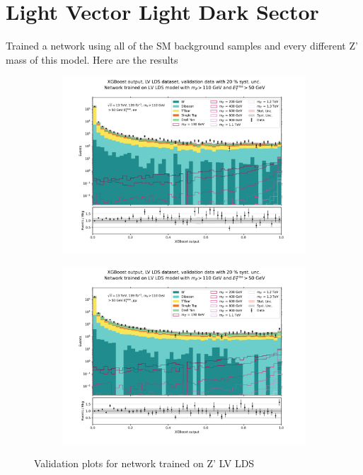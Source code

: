 \documentclass[14pt, a4paper]{book}
\begin{document}
\newpage
\section{Light Vector Light Dark Sector}Trained a network using all of the SM background samples and every different Z' mass of this model. Here are the results
\begin{figure}[!ht]
	\centering
	\begin{subfigure}[b]{0.49\textwidth}
      \centering
      \includegraphics[width=1\textwidth]{XGBoost/LV_LDS/VAL_ee.pdf}
      \end{subfigure}
   \hfill
   \begin{subfigure}[b]{0.49\textwidth}
      \centering
      \includegraphics[width=1\textwidth]{XGBoost/LV_LDS/VAL_uu.pdf}
      \end{subfigure}
   \caption{Validation plots for network trained on Z' LV LDS}\label{fig:LV_LDS_vals}
\end{figure}
\end{document}
